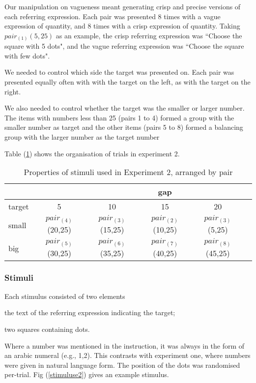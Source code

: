 \documentclass[man,floatmark]{apa}
\begin{document}
Our manipulation on vagueness meant generating crisp and precise versions of each referring expression. Each pair was presented 8 times with a vague expression of quantity, and 8 times with a crisp expression of quantity. Taking $pair_{(1)}(5,25)$ as an example, the crisp referring expression was ``Choose the square with 5 dots", and the vague referring expression was ``Choose the square with few dots".

We needed to control which side the target was presented on. Each pair was presented equally often with with the target on the left, as with the target on the right.

We also needed to control whether the target was the smaller or larger number. The items with numbers less than 25 (pairs 1 to 4) formed a group with the smaller number as target and the other items (pairs 5 to 8) formed a balancing group with the larger number as the target number

Table (\ref{tablee2}) shows the organisation of trials in experiment 2.

\begin{table}[tbp]
\caption{Properties of stimuli used in Experiment 2, arranged by pair}
\label{tablee2}
\begin{tabular}{lccccl}
&&&gap&&\\
\hline
target&5&10&15&20\\
\hline
	small&		$pair_{(4)}$(20,25)&$pair_{(3)}$(15,25)&$pair_{(2)}$(10,25)&$pair_{(3)}$(5,25)\\
 	big     &		$pair_{(5)}$(30,25)&$pair_{(6)}$(35,25)&$pair_{(7)}$(40,25)&$pair_{(8)}$(45,25)\\
\end{tabular}
\end{table}

\subsubsection{Stimuli}

Each stimulus consisted of two elements \begin{seriate} \item the text of the referring expression indicating the target; \item two squares containing dots. \end{seriate} Where a number was mentioned in the instruction, it was always in the form of an arabic numeral (e.g., 1,2). This contrasts with experiment one, where numbers were given in natural language form. The position of the dots was randomised per-trial.
Fig (\ref{stimuluse2}) gives an example stimulus.
\end{document}
